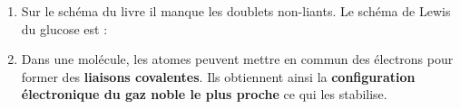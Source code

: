 \documentclass[12pt,a4paper,fleqn]{article}
\begin{document}
\begin{enumerate}
\item Sur le schéma du livre il manque les doublets non-liants.
Le schéma de Lewis du glucose est :
\begin{center}
\end{center}

\item
Dans une molécule, les atomes peuvent mettre en commun des électrons pour former des \textbf{liaisons covalentes}.
Ils obtiennent ainsi la \textbf{configuration électronique du gaz noble le plus proche} ce qui les stabilise.
\end{enumerate}
\end{document}
